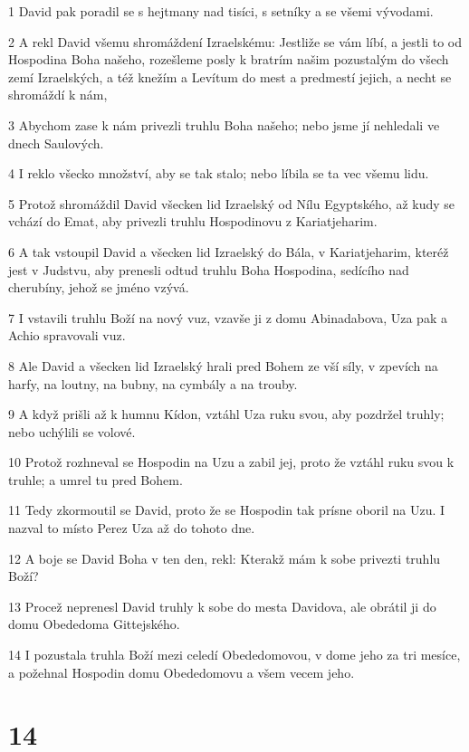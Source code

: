 \par 1 David pak poradil se s hejtmany nad tisíci, s setníky a se všemi vývodami.
\par 2 A rekl David všemu shromáždení Izraelskému: Jestliže se vám líbí, a jestli to od Hospodina Boha našeho, rozešleme posly k bratrím našim pozustalým do všech zemí Izraelských, a též knežím a Levítum do mest a predmestí jejich, a necht se shromáždí k nám,
\par 3 Abychom zase k nám privezli truhlu Boha našeho; nebo jsme jí nehledali ve dnech Saulových.
\par 4 I reklo všecko množství, aby se tak stalo; nebo líbila se ta vec všemu lidu.
\par 5 Protož shromáždil David všecken lid Izraelský od Nílu Egyptského, až kudy se vchází do Emat, aby privezli truhlu Hospodinovu z Kariatjeharim.
\par 6 A tak vstoupil David a všecken lid Izraelský do Bála, v Kariatjeharim, kteréž jest v Judstvu, aby prenesli odtud truhlu Boha Hospodina, sedícího nad cherubíny, jehož se jméno vzývá.
\par 7 I vstavili truhlu Boží na nový vuz, vzavše ji z domu Abinadabova, Uza pak a Achio spravovali vuz.
\par 8 Ale David a všecken lid Izraelský hrali pred Bohem ze vší síly, v zpevích na harfy, na loutny, na bubny, na cymbály a na trouby.
\par 9 A když prišli až k humnu Kídon, vztáhl Uza ruku svou, aby pozdržel truhly; nebo uchýlili se volové.
\par 10 Protož rozhneval se Hospodin na Uzu a zabil jej, proto že vztáhl ruku svou k truhle; a umrel tu pred Bohem.
\par 11 Tedy zkormoutil se David, proto že se Hospodin tak prísne oboril na Uzu. I nazval to místo Perez Uza až do tohoto dne.
\par 12 A boje se David Boha v ten den, rekl: Kterakž mám k sobe privezti truhlu Boží?
\par 13 Procež neprenesl David truhly k sobe do mesta Davidova, ale obrátil ji do domu Obededoma Gittejského.
\par 14 I pozustala truhla Boží mezi celedí Obededomovou, v dome jeho za tri mesíce, a požehnal Hospodin domu Obededomovu a všem vecem jeho.

\chapter{14}

